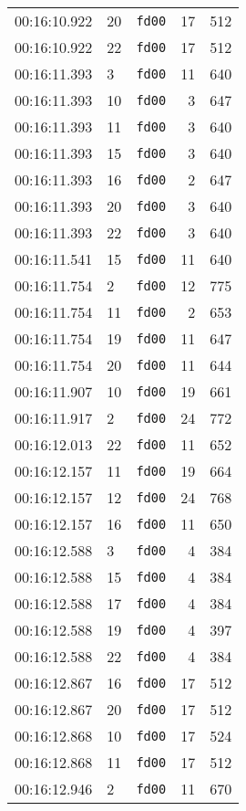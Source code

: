 \documentclass{article}
\begin{document}
\begin{longtable}{lllrr}
00:16:10.922 & 20 & \texttt{fd00} & 17 & 512 \\
00:16:10.922 & 22 & \texttt{fd00} & 17 & 512 \\
00:16:11.393 & 3 & \texttt{fd00} & 11 & 640 \\
00:16:11.393 & 10 & \texttt{fd00} & 3 & 647 \\
00:16:11.393 & 11 & \texttt{fd00} & 3 & 640 \\
00:16:11.393 & 15 & \texttt{fd00} & 3 & 640 \\
00:16:11.393 & 16 & \texttt{fd00} & 2 & 647 \\
00:16:11.393 & 20 & \texttt{fd00} & 3 & 640 \\
00:16:11.393 & 22 & \texttt{fd00} & 3 & 640 \\
00:16:11.541 & 15 & \texttt{fd00} & 11 & 640 \\
00:16:11.754 & 2 & \texttt{fd00} & 12 & 775 \\
00:16:11.754 & 11 & \texttt{fd00} & 2 & 653 \\
00:16:11.754 & 19 & \texttt{fd00} & 11 & 647 \\
00:16:11.754 & 20 & \texttt{fd00} & 11 & 644 \\
00:16:11.907 & 10 & \texttt{fd00} & 19 & 661 \\
00:16:11.917 & 2 & \texttt{fd00} & 24 & 772 \\
00:16:12.013 & 22 & \texttt{fd00} & 11 & 652 \\
00:16:12.157 & 11 & \texttt{fd00} & 19 & 664 \\
00:16:12.157 & 12 & \texttt{fd00} & 24 & 768 \\
00:16:12.157 & 16 & \texttt{fd00} & 11 & 650 \\
00:16:12.588 & 3 & \texttt{fd00} & 4 & 384 \\
00:16:12.588 & 15 & \texttt{fd00} & 4 & 384 \\
00:16:12.588 & 17 & \texttt{fd00} & 4 & 384 \\
00:16:12.588 & 19 & \texttt{fd00} & 4 & 397 \\
00:16:12.588 & 22 & \texttt{fd00} & 4 & 384 \\
00:16:12.867 & 16 & \texttt{fd00} & 17 & 512 \\
00:16:12.867 & 20 & \texttt{fd00} & 17 & 512 \\
00:16:12.868 & 10 & \texttt{fd00} & 17 & 524 \\
00:16:12.868 & 11 & \texttt{fd00} & 17 & 512 \\
00:16:12.946 & 2 & \texttt{fd00} & 11 & 670 \\

\end{longtable}
\end{document}
